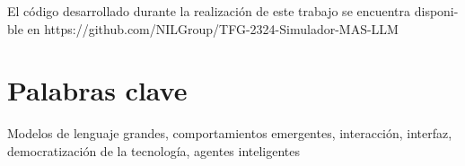 El código desarrollado durante la realización de este trabajo se encuentra disponi- ble en https://github.com/NILGroup/TFG-2324-Simulador-MAS-LLM


\section*{Palabras clave}
   
\noindent Modelos de lenguaje grandes, comportamientos emergentes, interacción, interfaz, democratización de la tecnología, agentes inteligentes

   


